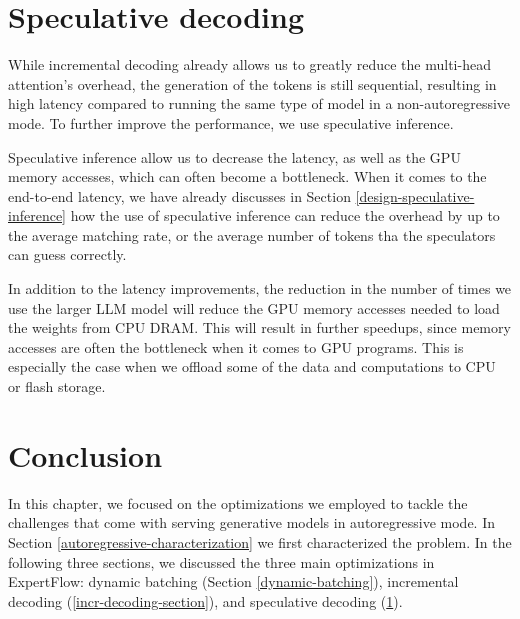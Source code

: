 \section{Speculative decoding}\label{spec-decoding-section}

While incremental decoding already allows us to greatly reduce the multi-head attention's overhead, the generation of the tokens is still sequential, resulting in high latency compared to running the same type of model in a non-autoregressive mode. To further improve the performance, we use speculative inference.

Speculative inference allow us to decrease the latency, as well as the GPU memory accesses, which can often become a bottleneck. When it comes to the end-to-end latency, we have already discusses in Section \ref{design-speculative-inference} how the use of speculative inference can reduce the overhead by up to the average matching rate, or the average number of tokens tha the speculators can guess correctly. 

In addition to the latency improvements, the reduction in the number of times we use the larger LLM model will reduce the GPU memory accesses needed to load the weights from CPU DRAM. This will result in further speedups, since memory accesses are often the bottleneck when it comes to GPU programs. This is especially the case when we offload some of the data and computations to CPU or flash storage. 


\section{Conclusion}
In this chapter, we focused on the optimizations we employed to tackle the challenges that come with serving generative models in autoregressive mode. In Section \ref{autoregressive-characterization} we first characterized the problem. In the following three sections, we discussed the three main optimizations in ExpertFlow: dynamic batching (Section \ref{dynamic-batching}), incremental decoding (\ref{incr-decoding-section}), and speculative decoding (\ref{spec-decoding-section}). 